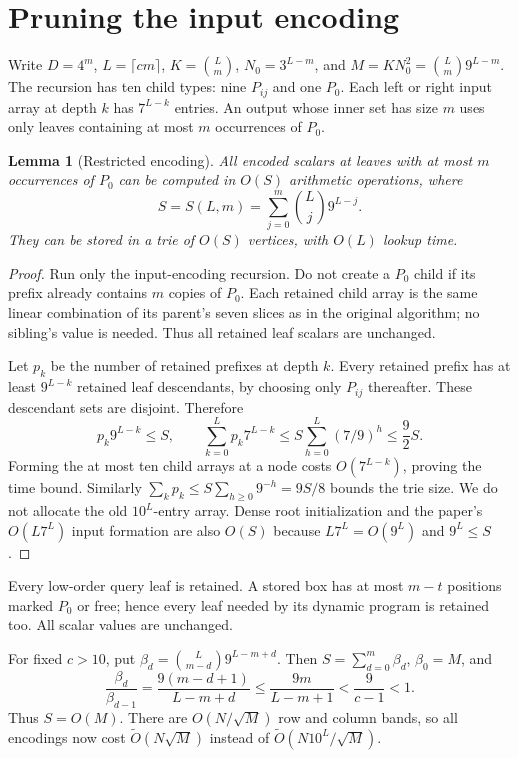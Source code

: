 \documentclass[11pt]{article}
\newtheorem{lemma}[theorem]{Lemma}
\newcommand{\softO}{\widetilde O}
\begin{document}
\section{Pruning the input encoding}
Write $D=4^m$, $L=\lceil cm\rceil$, $K=\binom Lm$,
$N_0=3^{L-m}$, and $M=KN_0^2=\binom Lm9^{L-m}$.
The recursion has ten child types: nine $P_{ij}$ and one $P_0$.
Each left or right input array at depth $k$ has $7^{L-k}$ entries.
An output whose inner set has size $m$ uses only leaves containing at most
$m$ occurrences of $P_0$.

\begin{lemma}[Restricted encoding]
All encoded scalars at leaves with at most $m$ occurrences of $P_0$ can be
computed in $O(S)$ arithmetic operations, where
\[
S=S(L,m)=\sum_{j=0}^m\binom Lj9^{L-j}.
\]
They can be stored in a trie of $O(S)$ vertices, with $O(L)$ lookup time.
\end{lemma}
\begin{proof}
Run only the input-encoding recursion. Do not create a $P_0$ child if its
prefix already contains $m$ copies of $P_0$. Each retained child array is the
same linear combination of its parent's seven slices as in the original
algorithm; no sibling's value is needed. Thus all retained leaf scalars are
unchanged.

Let $p_k$ be the number of retained prefixes at depth $k$. Every retained
prefix has at least $9^{L-k}$ retained leaf descendants, by choosing only
$P_{ij}$ thereafter. These descendant sets are disjoint. Therefore
\[
p_k9^{L-k}\le S,\qquad
\sum_{k=0}^Lp_k7^{L-k}
\le S\sum_{h=0}^L(7/9)^h\le \frac92 S.
\]
Forming the at most ten child arrays at a node costs $O(7^{L-k})$, proving
the time bound. Similarly $\sum_k p_k\le S\sum_{h\ge0}9^{-h}=9S/8$ bounds
the trie size. We do not allocate the old $10^L$-entry array.
Dense root initialization and the paper's $O(L7^L)$ input formation are
also $O(S)$ because $L7^L=O(9^L)$ and $9^L\le S$.
\end{proof}

Every low-order query leaf is retained. A stored box has at most $m-t$
positions marked $P_0$ or free; hence every leaf needed by its dynamic
program is retained too. All scalar values are unchanged.

For fixed $c>10$, put $\beta_d=\binom L{m-d}9^{L-m+d}$.
Then $S=\sum_{d=0}^m\beta_d$, $\beta_0=M$, and
\[
\frac{\beta_d}{\beta_{d-1}}
=\frac{9(m-d+1)}{L-m+d}
\le\frac{9m}{L-m+1}<\frac9{c-1}<1.
\]
Thus $S=O(M)$. There are $O(N/\sqrt M)$ row and column bands, so all
encodings now cost $\softO(N\sqrt M)$ instead of
$\softO(N10^L/\sqrt M)$.
\end{document}
